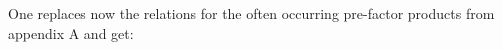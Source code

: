 One replaces now the relations for the often occurring pre-factor products from appendix A and get:
